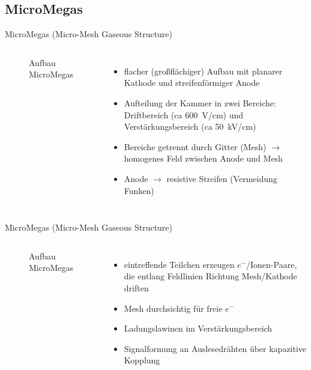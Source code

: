 \subsection[]{MicroMegas}

\begin{frame}{MicroMegas (Micro-Mesh Gaseous Structure)}
    \begin{columns}[T]
			\begin{figure}[htbp]
			  \centering
			  
			  \caption{Aufbau MicroMegas}
			\end{figure}
			
	    	\begin{itemize}
	    	  \item flacher (großflächiger) Aufbau mit planarer Kathode und streifenförmiger Anode
	    	  \item Aufteilung der Kammer in zwei Bereiche: Driftbereich (ca 600~V/cm) und
	    	  Verstärkungsbereich (ca 50~kV/cm)
	    	  \item Bereiche getrennt durch Gitter (Mesh) $\rightarrow$ homogenes Feld zwischen Anode
	    	  und Mesh
	    	  \item Anode $\rightarrow$ resistive Streifen (Vermeidung Funken)
			\end{itemize}
    \end{columns}
\end{frame}


\begin{frame}{MicroMegas (Micro-Mesh Gaseous Structure)}
    \begin{columns}[T]
			\begin{figure}[htbp]
			  \centering
			  
			  \caption{Aufbau MicroMegas}
			\end{figure}
	    	\begin{itemize}
	    	  \item eintreffende Teilchen erzeugen $e^-$/Ionen-Paare, die entlang Feldlinien Richtung
	    	  Mesh/Kathode driften
	    	  \item Mesh durchsichtig für freie $e^-$
	    	  \item Ladungslawinen im Verstärkungsbereich
	    	  \item Signalformung an Auslesedrähten über kapazitive Kopplung
			\end{itemize}
    \end{columns} 
\end{frame}

